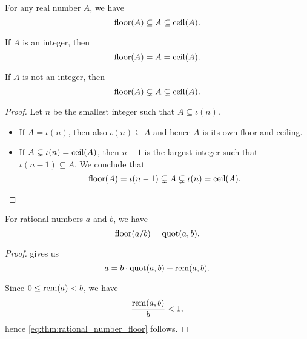 \begin{proposition}\label{thm:real_floor_ceiling_interval}
  For any real number \( A \), we have
  \begin{equation*}
    \operatorname{floor}(A) \subseteq A \subseteq \operatorname{ceil}(A).
  \end{equation*}

  \begin{thmenum}
     If \( A \) is an integer, then
    \begin{equation*}
      \operatorname{floor}(A) = A = \operatorname{ceil}(A).
    \end{equation*}

     If \( A \) is not an integer, then
    \begin{equation*}
      \operatorname{floor}(A) \subsetneq A \subsetneq \operatorname{ceil}(A).
    \end{equation*}
  \end{thmenum}
\end{proposition}
\begin{proof}
  Let \( n \) be the smallest integer such that \( A \subseteq \iota(n) \).
  \begin{itemize}
    \item If \( A = \iota(n) \), then also \( \iota(n) \subseteq A \) and hence \( A \) is its own floor and ceiling.
    \item If \( A \subsetneq \iota(n) = \operatorname{ceil}(A) \), then \( n - 1 \) is the largest integer such that \( \iota(n - 1) \subseteq A \). We conclude that
    \begin{equation*}
      \operatorname{floor}(A) = \iota(n - 1) \subsetneq A \subsetneq \iota(n) = \operatorname{ceil}(A).
    \end{equation*}
  \end{itemize}
\end{proof}

\begin{proposition}\label{thm:rational_number_floor}
  For rational numbers \( a \) and \( b \), we have
  \begin{equation}\label{eq:thm:rational_number_floor}
    \operatorname{floor}(a / b) = \operatorname{quot}(a, b).
  \end{equation}
\end{proposition}
\begin{proof}
   gives us
  \begin{equation*}
    a = b \cdot \operatorname{quot}(a, b) + \operatorname{rem}(a, b).
  \end{equation*}

  Since \( 0 \leq \operatorname{rem}(a) < b \), we have
  \begin{equation*}
    \frac {\operatorname{rem}(a, b)} b < 1,
  \end{equation*}
  hence \eqref{eq:thm:rational_number_floor} follows.
\end{proof}


